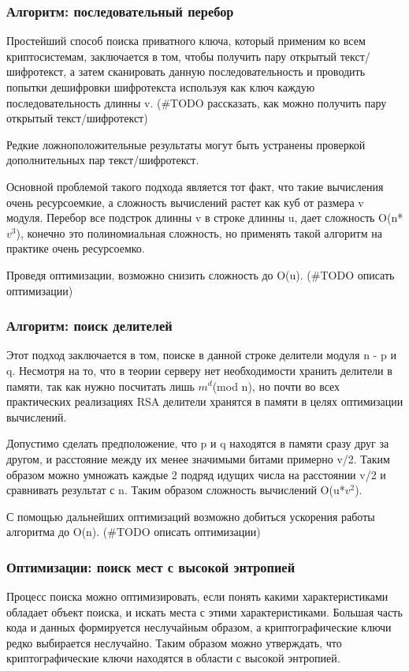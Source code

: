 \documentclass[20pt]{article}
\begin{document}
\subsubsection{Алгоритм: последовательный перебор}
Простейший способ поиска приватного ключа, который применим ко всем
криптосистемам, заключается в том, чтобы получить пару открытый текст/шифротекст,
а затем сканировать данную последовательность и проводить попытки дешифровки
шифротекста используя как ключ каждую последовательность длинны v. (#TODO рассказать,
как можно получить пару открытый текст/шифротекст)

Редкие ложноположительные результаты могут быть устранены проверкой
дополнительных пар текст/шифротекст.

Основной проблемой такого подхода является тот факт, что такие вычисления очень
ресурсоемкие, а сложность вычислений растет как куб от размера v модуля.
Перебор все подстрок длинны v в строке длинны u, дает сложность O(n*$v^3$),
конечно это полиномиальная сложность, но применять такой алгоритм на практике
очень ресурсоемко.

Проведя оптимизации, возможно снизить сложность до O(u). (#TODO описать оптимизации)

\subsubsection{Алгоритм: поиск делителей}
Этот подход заключается в том, поиске в данной строке делители модуля n - p и q.
Несмотря на то, что в теории серверу нет необходимости хранить делители в
памяти, так как нужно посчитать лишь $m^d$(mod n), но почти во всех практических
реализациях RSA делители хранятся в памяти в целях оптимизации вычислений.

Допустимо сделать предположение, что p и q находятся в памяти сразу друг за другом,
и расстояние между их менее значимыми битами примерно v/2. Таким образом можно
умножать каждые 2 подряд идущих числа на расстоянии v/2 и сравнивать результат с
n. Таким образом сложность вычислений O(u*$v^2$).

С помощью дальнейших оптимизаций возможно добиться ускорения работы алгоритма
до O(n). (#TODO описать оптимизации)

\subsubsection{Оптимизации: поиск мест с высокой энтропией}
Процесс поиска можно оптимизировать, если понять какими характеристиками обладает
объект поиска, и искать места с этими характеристиками. Большая часть кода и данных
формируется неслучайным образом, а криптографические ключи редко выбирается
неслучайно. Таким образом можно утверждать, что криптографические ключи находятся
в области с высокой энтропией.
\end{document}
